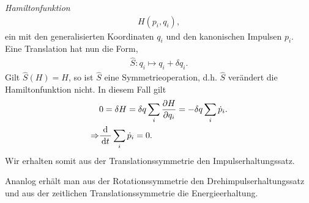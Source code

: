 \emph{Hamiltonfunktion}
\begin{align*}
H(p_i,q_i),
\end{align*}
ein mit den generalisierten Koordinaten $q_i$ und den kanonischen Impulsen
$p_i$. Eine Translation hat nun die Form,
\begin{align*}
\hat{S}: q_i \mapsto q_i + \delta q_i.
\end{align*}
Gilt $\hat{S}(H) = H$, so ist $\hat{S}$ eine Symmetrieoperation, d.h. $\hat{S}$
verändert die Hamiltonfunktion nicht. In diesem Fall gilt
\begin{align*}
&0 = \delta H = \delta q\sum_i \frac{\partial H}{\partial q_i} = -\delta q\sum_i
\dot{p}_i.\\
\Rightarrow & \frac{\mathrm{d}}{\,\mathrm{d} t\,} \sum_i \dot{p}_i = 0.
\end{align*}
Wir erhalten somit aus der Translationssymmetrie den Impulserhaltungssatz.

Ananlog erhält man aus der Rotationssymmetrie den Drehimpulserhaltungssatz und
aus der zeitlichen Translationssymmetrie die Energieerhaltung.


